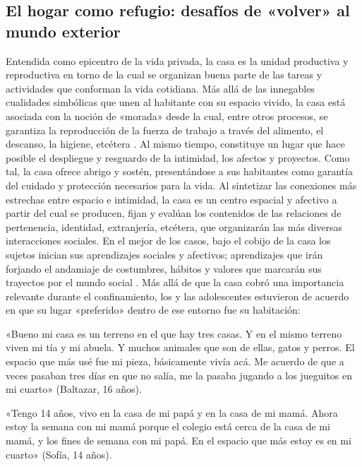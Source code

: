 \begin{refsection}
\section[El hogar como refugio: desafíos de «volver» al mundo exterior]{El hogar como refugio: desafíos de «volver» al mundo exterior}
\label{cap-26.el-hogar-como-refugio-desafios-de-volver-al-mundo-exterior}
Entendida como epicentro de la vida privada, la casa es la unidad productiva y reproductiva en torno de la cual se organizan buena parte de las tareas y actividades que conforman la vida cotidiana. Más allá de las innegables cualidades simbólicas que unen al habitante con su espacio vivido, la casa está asociada con la noción de «morada» desde la cual, entre otros procesos, se garantiza la reproducción de la fuerza de trabajo a través del alimento, el descanso, la higiene, etcétera \protect\parencite{4199-GARDINER1997}. Al mismo tiempo, constituye un lugar que hace posible el despliegue y resguardo de la intimidad, los afectos y proyectos. Como tal, la casa ofrece abrigo y sostén, presentándose a sus habitantes como garantía del cuidado y protección necesarios para la vida. Al sintetizar las conexiones más estrechas entre espacio e intimidad, la casa es un centro espacial y afectivo a partir del cual se producen, fijan y evalúan los contenidos de las relaciones de pertenencia, identidad, extranjería, etcétera, que organizarán las más diversas interacciones sociales. En el mejor de los casos, bajo el cobijo de la casa los sujetos inician sus aprendizajes sociales y afectivos; aprendizajes que irán forjando el andamiaje de costumbres, hábitos y valores que marcarán sus trayectos por el mundo social \protect\parencite{4228-HOCHSCHILD2008,4229-PAUTASSI2013}. Más allá de que la casa cobró una importancia relevante durante el confinamiento, los y las adolescentes estuvieron de acuerdo en que su lugar «preferido» dentro de ese entorno fue su habitación:


\begin{gbcita}
«Bueno mi casa es un terreno en el que hay tres casas. Y en el mismo terreno viven mi tía y mi abuela. Y muchos animales que son de ellas, gatos y perros. El espacio que más usé fue mi pieza, básicamente vivía acá. Me acuerdo de que a veces pasaban tres días en que no salía, me la pasaba jugando a los jueguitos en mi cuarto» (Baltazar, 16 años).

«Tengo 14 años, vivo en la casa de mi papá y en la casa de mi mamá. Ahora estoy la semana con mi mamá porque el colegio está cerca de la casa de mi mamá, y los fines de semana con mi papá. En el espacio que más estoy es en mi cuarto» (Sofía, 14 años).


\end{gbcita}
\end{refsection}

